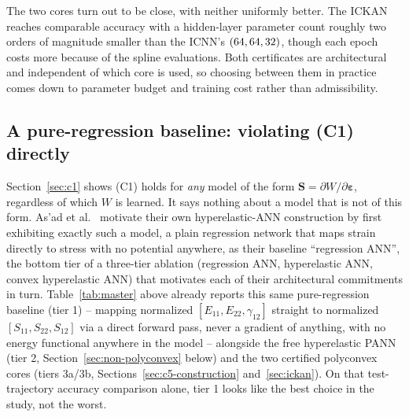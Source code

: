 \documentclass[10pt,a4paper]{article}
\begin{document}
The two cores turn out to be close, with neither uniformly better. The
ICKAN reaches comparable accuracy with a hidden-layer parameter count
roughly two orders of magnitude smaller than the ICNN's
$(64,64,32{})$, though each epoch costs more because of the spline
evaluations. Both certificates are architectural and independent of
which core is used, so choosing between them in practice comes down to
parameter budget and training cost rather than admissibility.

\subsection{A pure-regression baseline: violating (C1) directly}
\label{sec:c1-regression}
Section~\ref{sec:c1} shows (C1) holds for \emph{any} model of the form
$\bm S=\partial W/\partial\bm\varepsilon$, regardless of which $W$ is
learned. It says nothing about a model that is not of this form. As'ad et
al.~\cite{Asad2022} motivate their own hyperelastic-ANN construction by
first exhibiting exactly such a model, a plain regression network that
maps strain directly to stress with no potential anywhere, as their
baseline ``regression ANN'', the bottom tier of a three-tier ablation
(regression ANN, hyperelastic ANN, convex hyperelastic ANN) that
motivates each of their architectural commitments in turn. Table~\ref{tab:master}
above already reports this same pure-regression baseline (tier 1) --
mapping normalized $[E_{11},E_{22},\gamma_{12}]$ straight to normalized
$[S_{11},S_{22},S_{12}]$ via a direct forward pass, never a gradient of
anything, with no energy functional anywhere in the model -- alongside
the free hyperelastic PANN (tier 2, Section~\ref{sec:non-polyconvex}
below) and the two certified polyconvex cores (tiers 3a/3b,
Sections~\ref{sec:c5-construction} and~\ref{sec:ickan}). On that
test-trajectory accuracy comparison alone, tier 1 looks like the best
choice in the study, not the worst.
\end{document}
